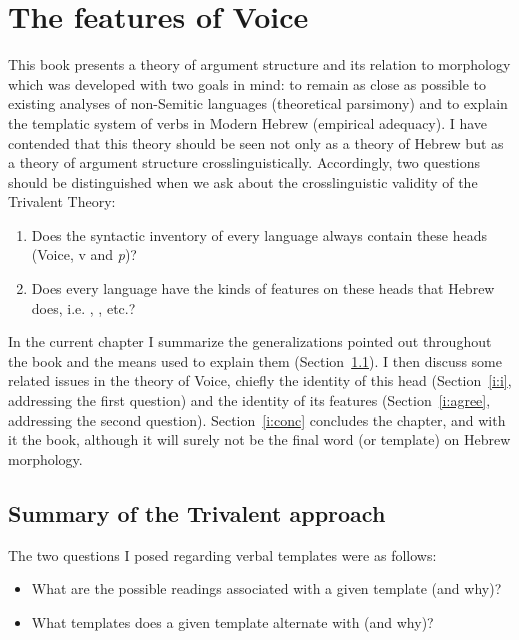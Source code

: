 \chapter{The features of Voice}
\label{chap:i}

This book presents a theory of argument structure and its relation to morphology which was developed with two goals in mind: to remain as close as possible to existing analyses of non-Semitic languages (theoretical parsimony) and to explain the templatic system of verbs in Modern Hebrew (empirical adequacy). I have contended that this theory should be seen not only as a theory of Hebrew but as a theory of argument structure crosslinguistically. Accordingly, two questions should be distinguished when we ask about the crosslinguistic validity of the Trivalent Theory:

\begin{enumerate}
	\item Does the syntactic inventory of every language always contain these heads (Voice, v and \emph{p})?
	\item Does every language have the kinds of features on these heads that Hebrew does, i.e. {\vd}, \pz, etc.?
\end{enumerate}

In the current chapter I summarize the generalizations pointed out throughout the book and the means used to explain them (Section~\ref{i:sum}). I then discuss some related issues in the theory of Voice, chiefly the identity of this head (Section~\ref{i:i}, addressing the first question) and the identity of its features (Section~\ref{i:agree}, addressing the second question). Section~\ref{i:conc} concludes the chapter, and with it the book, although it will surely not be the final word (or template) on Hebrew morphology.


\section{Summary of the Trivalent approach} \label{i:sum}
The two questions I posed regarding verbal templates were as follows:

\begin{itemize}
	\item \sloppy What are the possible readings associated with a given template (and why)?
	\item What templates does a given template alternate with (and why)?
\end{itemize}

